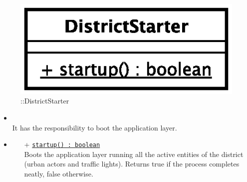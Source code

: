 \begin{figure}[h]
\centering
\includegraphics[scale=0.6,keepaspectratio]{images/solution/app/backend/district_starter.eps}
\caption{\pReactive::DistrictStarter}
\label{fig:sd-app-district-starter}
\end{figure}
\FloatBarrier
\begin{itemize}
  \item \textbf{\descr} \\
  It has the responsibility to boot the application layer.
  \item \textbf{\ops}
  \begin{itemize}
    \item[+] \texttt{\underline{startup() : boolean}} \\
    Boots the application layer running all the active entities of the 
    district (urban actors and traffic lights).
    Returns true if the process completes neatly, false otherwise.
  \end{itemize}
\end{itemize} 
